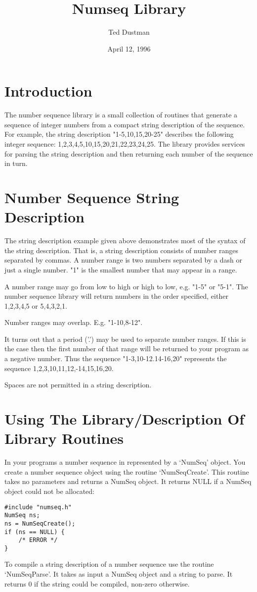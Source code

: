 \documentclass[letterpaper,twoside,10pt]{article}
\begin{document}
\title{
        Numseq Library
}
\author{
        Ted Dustman     %
}
\date{April 12, 1996}   %

\maketitle

\section{Introduction}
The number sequence library is a small collection of routines that generate
a sequence of integer numbers from a compact string description of the
sequence.  For example, the string description "1-5,10,15,20-25" describes
the following integer sequence: 1,2,3,4,5,10,15,20,21,22,23,24,25.  The
library provides services for parsing the string description and then
returning each number of the sequence in turn.

\section{Number Sequence String Description}
The string description example given above demonstrates most of the syntax
of the string description.  That is, a string description consists of
number ranges separated by commas.  A number range is two numbers separated
by a dash or just a single number.  "1" is the smallest number that may
appear in a range.

A number range may go from low to high or high to low, e.g. "1-5" or "5-1".
The number sequence library will return numbers in the order specified,
either 1,2,3,4,5 or 5,4,3,2,1.

Number ranges may overlap. E.g. "1-10,8-12".

It turns out that a period ('.') may be used to separate number ranges.  If
this is the case then the first number of that range will be returned to
your program as a negative number.  Thus the sequence "1-3,10-12.14-16,20"
represents the sequence 1,2,3,10,11,12,-14,15,16,20.

Spaces are not permitted in a string description.

\section{Using The Library/Description Of Library Routines}
In your programs a number sequence in represented by a `NumSeq' object.
You create a number sequence object using the routine `NumSeqCreate'.  This
routine takes no parameters and returns a NumSeq object.  It returns NULL
if a NumSeq object could not be allocated:
\begin{verbatim}
#include "numseq.h"
NumSeq ns;
ns = NumSeqCreate();
if (ns == NULL) {
    /* ERROR */
}
\end{verbatim}
To compile a string description of a number sequence use the routine
`NumSeqParse'.  It takes as input a NumSeq object and a string to parse.
It returns 0 if the string could be compiled, non-zero otherwise.
\end{document}
